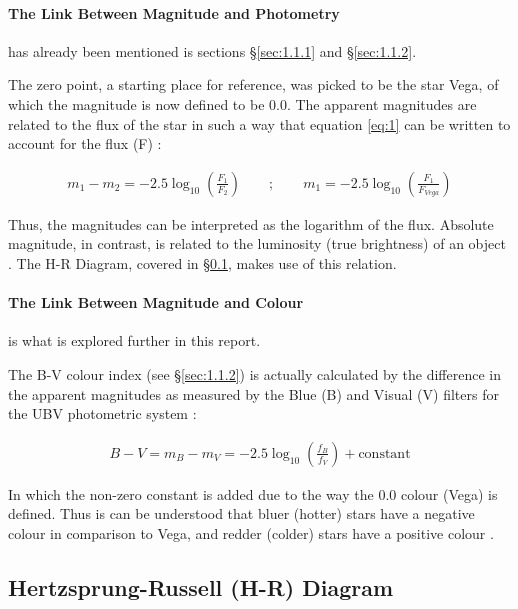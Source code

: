 \documentclass[12pt]{article}
\begin{document}
\paragraph{The Link Between Magnitude and Photometry} \label{sec:1.1.3.1} has already been mentioned is sections §\ref{sec:1.1.1} and §\ref{sec:1.1.2}.

The zero point, a starting place for reference, was picked to be the star Vega, of which the magnitude is now defined to be $0.0$.
The apparent magnitudes are related to the flux of the star in such a way that equation \ref{eq:1} can be written to account for the flux (F) \cite{ccds}:

\vspace{-1.5ex}
\begin{gather} \label{eq:3}
    m_1 - m_2 = -2.5 \log_{10}\left(\frac{F_1}{F_2}\right) \qquad ; \qquad m_1 = -2.5 \log_{10}\left(\frac{F_1}{F_{Vega}}\right)
\end{gather}

Thus, the magnitudes can be interpreted as the logarithm of the flux.
Absolute magnitude, in contrast, is related to the luminosity (true brightness) of an object
\cite{ccds}.
The H-R Diagram, covered in §\ref{sec:1.2}, makes use of this relation.

\paragraph{The Link Between Magnitude and Colour} \label{sec:1.1.3.2} is what is explored further in this report.

The B-V colour index (see §\ref{sec:1.1.2}) is actually calculated by the difference in the apparent magnitudes as measured by the Blue (B) and Visual (V) filters
for the UBV photometric system \cite{ccds}:

\vspace{-1.5ex}
\begin{gather} \label{eq:4}
    B-V = m_B - m_V = -2.5 \log_{10}\left( \frac{f_B}{f_V} \right) + \text{constant}
\end{gather}

In which the non-zero constant is added due to the way the 0.0 colour (Vega) is defined. Thus is can be understood that bluer (hotter) stars have a negative colour
in comparison to Vega, and redder (colder) stars have a positive colour
\cite{ccds}.

\subsection{Hertzsprung-Russell (H-R) Diagram} \label{sec:1.2}
\end{document}
